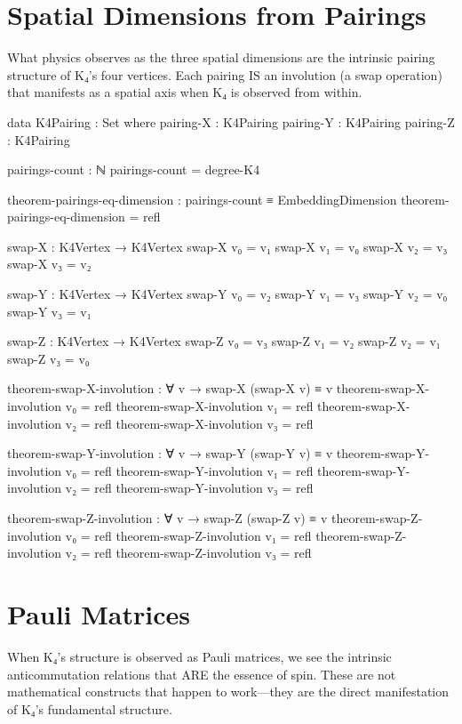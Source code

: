 \documentclass[11pt,a4paper]{book}
\begin{document}
\section{Spatial Dimensions from Pairings}

What physics observes as the three spatial dimensions are the intrinsic pairing structure of K₄'s four vertices. Each pairing IS an involution (a swap operation) that manifests as a spatial axis when K₄ is observed from within.

\begin{code}
data K4Pairing : Set where
  pairing-X : K4Pairing
  pairing-Y : K4Pairing
  pairing-Z : K4Pairing

pairings-count : ℕ
pairings-count = degree-K4

theorem-pairings-eq-dimension : pairings-count ≡ EmbeddingDimension
theorem-pairings-eq-dimension = refl

swap-X : K4Vertex → K4Vertex
swap-X v₀ = v₁
swap-X v₁ = v₀
swap-X v₂ = v₃
swap-X v₃ = v₂

swap-Y : K4Vertex → K4Vertex
swap-Y v₀ = v₂
swap-Y v₁ = v₃
swap-Y v₂ = v₀
swap-Y v₃ = v₁

swap-Z : K4Vertex → K4Vertex
swap-Z v₀ = v₃
swap-Z v₁ = v₂
swap-Z v₂ = v₁
swap-Z v₃ = v₀

theorem-swap-X-involution : ∀ v → swap-X (swap-X v) ≡ v
theorem-swap-X-involution v₀ = refl
theorem-swap-X-involution v₁ = refl
theorem-swap-X-involution v₂ = refl
theorem-swap-X-involution v₃ = refl

theorem-swap-Y-involution : ∀ v → swap-Y (swap-Y v) ≡ v
theorem-swap-Y-involution v₀ = refl
theorem-swap-Y-involution v₁ = refl
theorem-swap-Y-involution v₂ = refl
theorem-swap-Y-involution v₃ = refl

theorem-swap-Z-involution : ∀ v → swap-Z (swap-Z v) ≡ v
theorem-swap-Z-involution v₀ = refl
theorem-swap-Z-involution v₁ = refl
theorem-swap-Z-involution v₂ = refl
theorem-swap-Z-involution v₃ = refl
\end{code}

\section{Pauli Matrices}

When K₄'s structure is observed as Pauli matrices, we see the intrinsic anticommutation relations that ARE the essence of spin. These are not mathematical constructs that happen to work—they are the direct manifestation of K₄'s fundamental structure.
\end{document}
